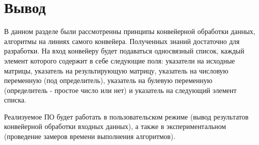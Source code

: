 \section{Вывод}

В данном разделе были рассмотренны принципы конвейерной обработки данных, алгоритмы на линиях самого конвейера. Полученных знаний достаточно для разработки. На вход конвейеру будет подаваться односвязный список, каждый элемент которого содержит в себе следующие поля: указатели на исходные матрицы, указатель на результирующую матрицу, указатель на числовую переменную (под определитель), указатель на булевую переменную (определитель - простое число или нет) и указатель на следующий элемент списка.

Реализуемое ПО будет работать в пользовательском режиме (вывод результатов конвейерной обработки входных данных), а также в экспериментальном (проведение замеров времени выполнения алгоритмов).